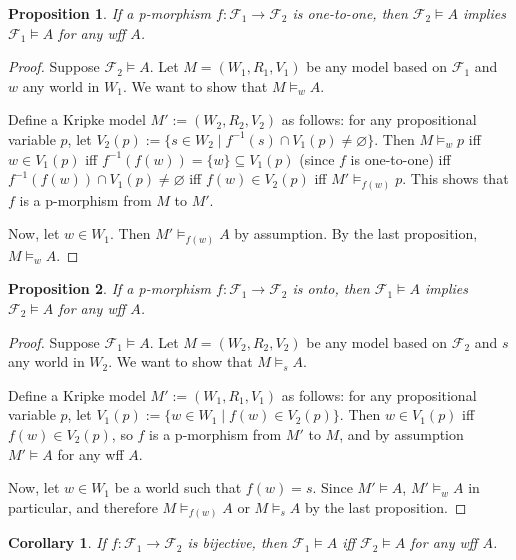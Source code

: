 \documentclass[12pt]{article}
\newtheorem{prop}{Proposition}
\newtheorem{cor}{Corollary}
\begin{document}
\begin{prop} If a p-morphism $f:\mathcal{F}_1\to \mathcal{F}_2$ is one-to-one, then $\mathcal{F}_2 \models A$ implies $\mathcal{F}_1 \models A$ for any wff $A$. \end{prop}
\begin{proof}  Suppose $\mathcal{F}_2 \models A$.  Let $M=(W_1,R_1,V_1)$ be any model based on $\mathcal{F}_1$ and $w$ any world in $W_1$.  We want to show that $M \models_w A$.

Define a Kripke model $M':=(W_2,R_2,V_2)$ as follows: for any propositional variable $p$, let $V_2(p):= \lbrace s\in W_2 \mid f^{-1}(s) \cap V_1(p) \ne \varnothing \rbrace$.  Then $M \models_w p$ iff $w \in V_1(p)$ iff $f^{-1}(f(w)) =\lbrace w \rbrace  \subseteq V_1(p)$ (since $f$ is one-to-one) iff $f^{-1}(f(w))\cap V_1(p)\ne \varnothing$ iff $f(w)\in V_2(p)$ iff $M' \models_{f(w)} p$.  This shows that $f$ is a p-morphism from $M$ to $M'$.

Now, let $w\in W_1$.  Then $M'\models_{f(w)} A$ by assumption.  By the last proposition, $M \models_w A$.
\end{proof}

\begin{prop} If a p-morphism $f:\mathcal{F}_1\to \mathcal{F}_2$ is onto, then $\mathcal{F}_1 \models A$ implies $\mathcal{F}_2 \models A$ for any wff $A$. \end{prop}
\begin{proof}  Suppose $\mathcal{F}_1 \models A$.  Let $M=(W_2,R_2,V_2)$ be any model based on $\mathcal{F}_2$ and $s$ any world in $W_2$.  We want to show that $M \models_s A$.

Define a Kripke model $M':=(W_1,R_1,V_1)$ as follows: for any propositional variable $p$, let $V_1(p):= \lbrace w\in W_1 \mid f(w) \in V_2(p) \rbrace$.  Then $w\in V_1(p)$ iff $f(w)\in V_2(p)$, so $f$ is a p-morphism from $M'$ to $M$, and by assumption $M'\models A$ for any wff $A$.

Now, let $w\in W_1$ be a world such that $f(w)=s$.  Since $M'\models A$, $M'\models_w A$ in particular, and therefore $M\models_{f(w)} A$ or $M \models_s A$ by the last proposition.
\end{proof}

\begin{cor} If $f:\mathcal{F}_1\to \mathcal{F}_2$ is bijective, then $\mathcal{F}_1 \models A$ iff $\mathcal{F}_2 \models A$ for any wff $A$. \end{cor}
\end{document}

